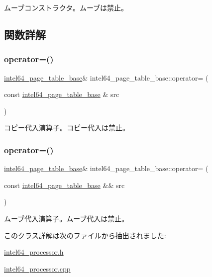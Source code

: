 ムーブコンストラクタ。ムーブは禁止。 

\subsection{関数詳解}
\hypertarget{classintel64__page__table__base_a20ad57e3d3901f93e3bd15f00e4449ea}{}\label{classintel64__page__table__base_a20ad57e3d3901f93e3bd15f00e4449ea} 
\subsubsection{\texorpdfstring{operator=()}{operator=()}\hspace{0.1cm}{\footnotesize\ttfamily [1/2]}}
{\footnotesize\ttfamily \hyperlink{classintel64__page__table__base}{intel64\+\_\+page\+\_\+table\+\_\+base}\& intel64\+\_\+page\+\_\+table\+\_\+base\+::operator= (\begin{DoxyParamCaption}\item[{const \hyperlink{classintel64__page__table__base}{intel64\+\_\+page\+\_\+table\+\_\+base} \&}]{src }\end{DoxyParamCaption})\hspace{0.3cm}{\ttfamily [delete]}}

コピー代入演算子。コピー代入は禁止。 \hypertarget{classintel64__page__table__base_a4b2fcdc5872bf6d20fe3aca38b78e8ac}{}\label{classintel64__page__table__base_a4b2fcdc5872bf6d20fe3aca38b78e8ac} 
\subsubsection{\texorpdfstring{operator=()}{operator=()}\hspace{0.1cm}{\footnotesize\ttfamily [2/2]}}
{\footnotesize\ttfamily \hyperlink{classintel64__page__table__base}{intel64\+\_\+page\+\_\+table\+\_\+base}\& intel64\+\_\+page\+\_\+table\+\_\+base\+::operator= (\begin{DoxyParamCaption}\item[{const \hyperlink{classintel64__page__table__base}{intel64\+\_\+page\+\_\+table\+\_\+base} \&\&}]{src }\end{DoxyParamCaption})\hspace{0.3cm}{\ttfamily [delete]}}

ムーブ代入演算子。ムーブ代入は禁止。 

このクラス詳解は次のファイルから抽出されました\+:\begin{DoxyCompactItemize}
\item 
\hyperlink{intel64__processor_8h}{intel64\+\_\+processor.\+h}\item 
\hyperlink{intel64__processor_8cpp}{intel64\+\_\+processor.\+cpp}\end{DoxyCompactItemize}

